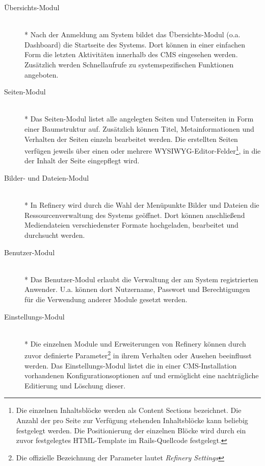 \begin{description}
\item[Übersichts-Modul]\mbox{~}\\*
Nach der Anmeldung am System bildet das Übersichts-Modul (o.a. Dashboard) die Startseite des Systems. Dort können in einer einfachen Form die letzten Aktivitäten innerhalb des CMS eingesehen werden. Zusätzlich werden Schnellaufrufe zu systemspezifischen Funktionen angeboten.
\item[Seiten-Modul]\mbox{~}\\*
Das Seiten-Modul listet alle angelegten Seiten und Unterseiten in Form einer Baumstruktur auf. Zusätzlich können Titel, Metainformationen und Verhalten der Seiten einzeln bearbeitet werden. Die erstellten Seiten verfügen jeweils über einen oder mehrere WYSIWYG-Editor-Felder\footnote{Die einzelnen Inhaltsblöcke werden als Content Sections bezeichnet. Die Anzahl der pro Seite zur Verfügung stehenden Inhaltsblöcke kann beliebig festgelegt werden. Die Positionierung der einzelnen Blöcke wird durch ein zuvor festgelegtes HTML-Template im Rails-Quellcode festgelegt.}, in die der Inhalt der Seite eingepflegt wird.
\item[Bilder- und Dateien-Modul]\mbox{~}\\*
In Refinery wird durch die Wahl der Menüpunkte Bilder und Dateien die Ressourcenverwaltung des Systems geöffnet. Dort können anschließend 	Mediendateien verschiedenster Formate hochgeladen, bearbeitet und durchsucht werden.
\item[Benutzer-Modul]\mbox{~}\\*
Das Benutzer-Modul erlaubt die Verwaltung der am System registrierten 	Anwender. U.a. können dort Nutzername, Passwort und Berechtigungen für die Verwendung anderer Module gesetzt werden.
\item[Einstellungs-Modul]\mbox{~}\\*
Die einzelnen Module und Erweiterungen von Refinery können durch zuvor definierte Parameter\footnote{Die offizielle Bezeichnung der Parameter lautet \emph{Refinery Settings}} in ihrem Verhalten oder Ausehen beeinflusst werden. Das Einstellungs-Modul listet die in einer CMS-Installation vorhandenen Konfigurationsoptionen auf und ermöglicht eine nachträgliche Editierung und Löschung dieser.
\end{description}
